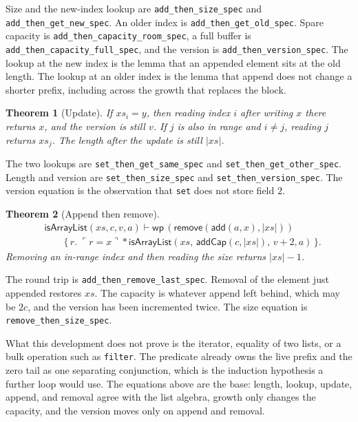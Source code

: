 \documentclass[11pt]{article}
\newtheorem{theorem}{Theorem}
\newcommand{\sep}{\mathbin{*}}
\newcommand{\Wpre}{\mathsf{wp}}
\newcommand{\pure}[1]{\ulcorner #1 \urcorner}
\begin{document}
Size and the new-index lookup are \texttt{add\_then\_size\_spec} and \texttt{add\_then\_get\_new\_spec}.
An older index is \texttt{add\_then\_get\_old\_spec}.
Spare capacity is \texttt{add\_then\_capacity\_room\_spec}, a full buffer is \texttt{add\_then\_capacity\_full\_spec}, and the version is \texttt{add\_then\_version\_spec}.
The lookup at the new index is the lemma that an appended element sits at the old length.
The lookup at an older index is the lemma that append does not change a shorter prefix, including across the growth that replaces the block.

\begin{theorem}[Update]
If \(xs_i = y\), then reading index \(i\) after writing \(x\) there returns \(x\), and the version is still \(v\).
If \(j\) is also in range and \(i \neq j\), reading \(j\) returns \(xs_j\).
The length after the update is still \(\lvert xs \rvert\).
\end{theorem}

The two lookups are \texttt{set\_then\_get\_same\_spec} and \texttt{set\_then\_get\_other\_spec}.
Length and version are \texttt{set\_then\_size\_spec} and \texttt{set\_then\_version\_spec}.
The version equation is the observation that \texttt{set} does not store field \(2\).

\begin{theorem}[Append then remove]
\[
\begin{aligned}
&\mathsf{isArrayList}(xs, c, v, a) \vdash
  \Wpre\,(\mathsf{remove}(\mathsf{add}(a, x), \lvert xs \rvert))\\
&\qquad \{\,r.\; \pure{r = x} \sep
  \mathsf{isArrayList}(xs,\, \mathsf{addCap}(c, \lvert xs \rvert),\, v+2, a)\,\}.
\end{aligned}
\]
Removing an in-range index and then reading the size returns \(\lvert xs \rvert - 1\).
\end{theorem}

The round trip is \texttt{add\_then\_remove\_last\_spec}.
Removal of the element just appended restores \(xs\).
The capacity is whatever append left behind, which may be \(2c\), and the version has been incremented twice.
The size equation is \texttt{remove\_then\_size\_spec}.

What this development does not prove is the iterator, equality of two lists, or a bulk operation such as \texttt{filter}.
The predicate already owns the live prefix and the zero tail as one separating conjunction, which is the induction hypothesis a further loop would use.
The equations above are the base: length, lookup, update, append, and removal agree with the list algebra, growth only changes the capacity, and the version moves only on append and removal.
\end{document}
